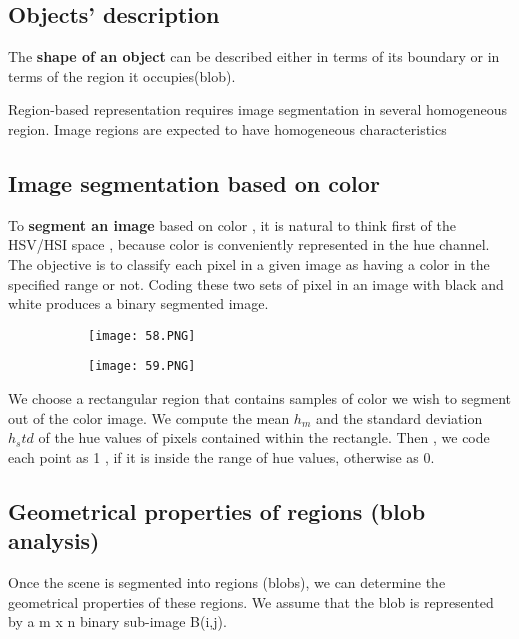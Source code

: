 \documentclass{article}
\begin{document}
\subsection{Objects' description}

The \textbf{shape of an object} can be described either in terms of its boundary or in terms of the region it occupies(blob).

Region-based representation requires image segmentation in several homogeneous region.
Image regions are expected to have homogeneous characteristics

\subsection{Image segmentation based on color}

To \textbf{segment an image} based on color , it is natural to think first of the HSV/HSI space , because color is conveniently represented in the hue channel.
The objective is to classify each pixel in a given image as having a color in the specified range or not.
Coding these two sets of pixel in an image with black and white produces a binary segmented image.

\begin{figure}[ht!]
  \centering
  \begin{subfigure}[b]{0.4\linewidth}
    \texttt{[image: 58.PNG]}
  \end{subfigure}
  \begin{subfigure}[b]{0.4\textwidth}
         \centering
         \texttt{[image: 59.PNG]}
     \end{subfigure}
\end{figure}

We choose a rectangular region that contains samples of color we wish to segment out of the color image.
We compute the mean $h_m$ and the standard deviation $h_std$ of the hue values of pixels contained within the rectangle.
Then , we code each point as 1 , if it is inside the range of hue values, otherwise as 0.

\subsection{Geometrical properties of regions (blob analysis)}

Once the scene is segmented into regions (blobs), we can determine the geometrical properties of these regions. We assume that the blob is represented by a m x n binary sub-image B(i,j).
\end{document}
